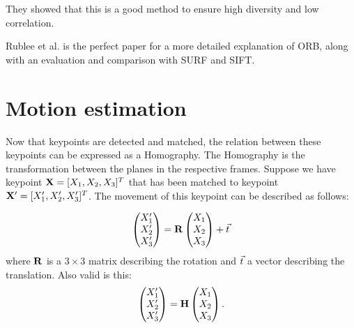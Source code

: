 They showed that this is a good method to ensure high diversity and low correlation.\bigskip

Rublee et al.\cite{6126544} is the perfect paper for a more detailed explanation of ORB, along with an evaluation and comparison with SURF and SIFT. 


\section{Motion estimation}
Now that keypoints are detected and matched, the relation between these keypoints can be expressed as a Homography. The Homography is the transformation between the planes in the respective frames. Suppose we have keypoint $\mathbf{X} = [X_1, X_2, X_3]^T$ that has been matched to keypoint $\mathbf{X}' = [X_1', X_2', X_3']^T$. The movement of this keypoint can be described as follows: 

\begin{equation} \label{eq:1}
    \begin{pmatrix}
        X_1' \\
        X_2' \\
        X_3'
    \end{pmatrix}
    = \mathbf{R}
    \begin{pmatrix}
        X_1 \\
        X_2 \\
        X_3
    \end{pmatrix}
    + \vec t
\end{equation}
where $\mathbf{R}$ is a $3 \times 3$ matrix describing the rotation and $\vec t$ a vector describing the translation. Also valid is this: 
\begin{equation}
    \begin{pmatrix}
        X_1' \\
        X_2' \\
        X_3'
    \end{pmatrix}
    = \mathbf{H}
    \begin{pmatrix}
        X_1 \\
        X_2 \\
        X_3
    \end{pmatrix}.
\end{equation} 

